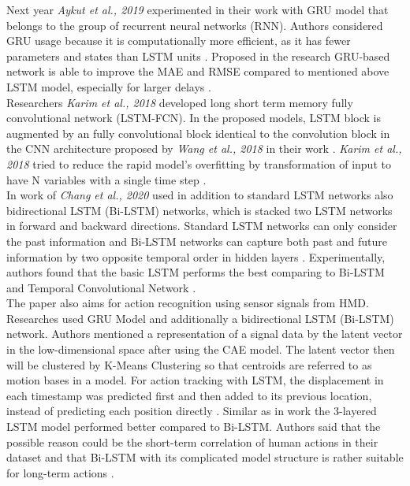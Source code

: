 Next year \textit{Aykut et al., 2019} experimented in their work \cite{telepresence} with GRU model that belongs to the group of recurrent neural networks (RNN). Authors considered GRU usage because it is computationally more efficient, as it has fewer parameters and states than LSTM units \cite{telepresence}. Proposed in the research GRU-based network is able to improve the MAE and RMSE compared to mentioned above LSTM model, especially for larger delays \cite{telepresence}. \\
Researchers \textit{Karim et al., 2018} developed long short term memory fully convolutional network (LSTM-FCN). In the proposed models, LSTM block is augmented by an fully convolutional block \cite{lstm_fcn} identical to the convolution block in the CNN architecture proposed by \textit{Wang et al., 2018} in their work \cite{timeseries_scratch}. \textit{Karim et al., 2018} tried to reduce the rapid model's overfitting by transformation of input to have N variables with a single time step \cite{lstm_fcn}.\\
In work of \textit{Chang et al., 2020} used in addition to standard LSTM networks also bidirectional LSTM (Bi-LSTM) networks, which is stacked two LSTM networks in forward and backward directions. Standard LSTM networks can only consider the past information and Bi-LSTM networks can capture both past and future information by two opposite temporal order in hidden layers \cite{6DoF_Tracking}. Experimentally, authors found that the basic LSTM performs the best comparing to Bi-LSTM and Temporal Convolutional Network  \cite{6DoF_Tracking}.\\
The paper \cite{action_recognition} also aims for action recognition using sensor signals from HMD. Researches used GRU Model and additionally a bidirectional LSTM (Bi-LSTM) network.  Authors mentioned a representation of a signal data by the latent vector in the low-dimensional space after using the CAE model. The latent vector then will be clustered by K-Means Clustering so that centroids are referred to as motion bases in a model. For action tracking with LSTM, the displacement in each timestamp was predicted first and then added to its previous location, instead of predicting each position directly \cite{action_recognition}. Similar as in work \cite{6DoF_Tracking} the 3-layered LSTM model performed better compared to Bi-LSTM. Authors said that the possible reason could be the short-term correlation of human actions in their dataset and that Bi-LSTM with its complicated model structure is rather suitable for long-term actions \cite{action_recognition}.\\
